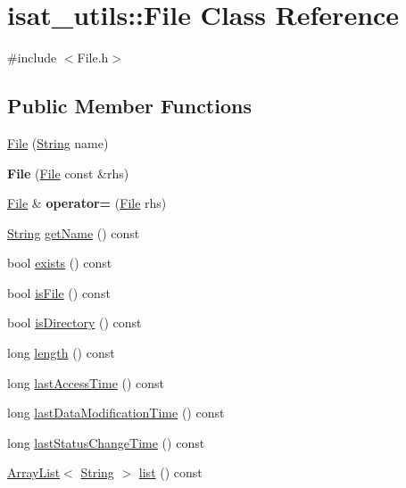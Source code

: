 \hypertarget{classisat__utils_1_1_file}{}\section{isat\+\_\+utils\+:\+:File Class Reference}
\label{classisat__utils_1_1_file}


{\ttfamily \#include $<$File.\+h$>$}

\subsection*{Public Member Functions}
\begin{DoxyCompactItemize}
\item 
\hyperlink{classisat__utils_1_1_file_ab5c27e041ed561bc2f4df177729e3a16}{File} (\hyperlink{classisat__utils_1_1_string}{String} name)
\item 
{\bfseries File} (\hyperlink{classisat__utils_1_1_file}{File} const \&rhs)\hypertarget{classisat__utils_1_1_file_af7d0caa9d270dec2ba47b7480f830f6a}{}\label{classisat__utils_1_1_file_af7d0caa9d270dec2ba47b7480f830f6a}

\item 
\hyperlink{classisat__utils_1_1_file}{File} \& {\bfseries operator=} (\hyperlink{classisat__utils_1_1_file}{File} rhs)\hypertarget{classisat__utils_1_1_file_a0707325fdb0f0d7e30b4dded4ca12968}{}\label{classisat__utils_1_1_file_a0707325fdb0f0d7e30b4dded4ca12968}

\item 
\hyperlink{classisat__utils_1_1_string}{String} \hyperlink{classisat__utils_1_1_file_a622367fe6c4acc18c1bc17d4622828da}{get\+Name} () const 
\item 
bool \hyperlink{classisat__utils_1_1_file_a4aac599cc77dd555da5139af109a0a8c}{exists} () const 
\item 
bool \hyperlink{classisat__utils_1_1_file_a4094a6e3a043afb50aa01244788c2d3e}{is\+File} () const 
\item 
bool \hyperlink{classisat__utils_1_1_file_ab701f989381170817b3d6d5f1538aa04}{is\+Directory} () const 
\item 
long \hyperlink{classisat__utils_1_1_file_a0a727f4f870d89361fbe5de225669edc}{length} () const 
\item 
long \hyperlink{classisat__utils_1_1_file_a4fb268c3238647d98fc09055341d3350}{last\+Access\+Time} () const 
\item 
long \hyperlink{classisat__utils_1_1_file_a70413578e0552a9d6b68f11c76a257f4}{last\+Data\+Modification\+Time} () const 
\item 
long \hyperlink{classisat__utils_1_1_file_ab6161b7629ab9316452e0a6c012fe5ed}{last\+Status\+Change\+Time} () const 
\item 
\hyperlink{classisat__utils_1_1_array_list}{Array\+List}$<$ \hyperlink{classisat__utils_1_1_string}{String} $>$ \hyperlink{classisat__utils_1_1_file_afa2650abc47107da9d3ec39d74c50043}{list} () const 
\end{DoxyCompactItemize}


